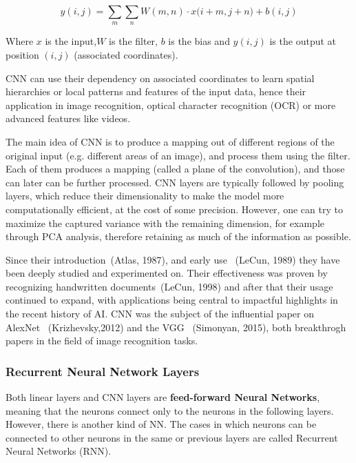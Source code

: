 \documentclass[a4paper, 11pt]{report}
\begin{document}
\begin{equation*}
    y(i,j) = \sum_m{\sum_n{W(m,n) \cdot x(i+m, j+n}) + b(i,j)}
\end{equation*}

 Where $x$ is the input,$W$ is the filter, $b$ is the bias and $y(i,j)$ is the output at position $(i,j)$ (associated coordinates).

 CNN can use their dependency on associated coordinates  to learn spatial hierarchies or local patterns and features of the input data, hence their application in image recognition, optical character recognition (OCR) or more advanced features like videos.

 The main idea of CNN is to produce a mapping out of different regions of the original input (e.g. different areas of an image), and process them using the filter. Each of them produces a mapping (called a plane of the convolution), and those can later can be further processed. CNN layers are typically followed by pooling layers, which reduce their dimensionality to make the model more computationally efficient, at the cost of some precision. However, one can try to maximize the captured variance with the remaining dimension, for example through PCA analysis, therefore retaining as much of the information as possible.

 Since their introduction~\cite{Atlas1987_Phoneme}(Atlas, 1987), and early use~\cite{LeCun1989_Handwritten_Zip} (LeCun, 1989) they have been deeply studied and experimented on. Their effectiveness was proven by recognizing handwritten documents~\cite{LeCun1998_Doc_Recognition}(LeCun, 1998) and after that their usage continued to expand, with applications being central to impactful highlights in the recent history of AI. CNN was the subject of the influential paper on AlexNet~\cite{Krizhevsky2012_AlexNet} (Krizhevsky,2012) and the VGG~\cite{Simonyan2015_Deep_Convolution} (Simonyan, 2015), both breakthrogh papers in the field of image recognition tasks.

\subsubsection{Recurrent Neural Network Layers}\label{Theory: RNN Layers}
 Both linear layers and CNN layers are \textbf{feed-forward Neural Networks}, meaning that the neurons connect only to the neurons in the following layers. However, there is another kind of NN. The cases in which neurons can be connected to other neurons in the same or previous layers are called Recurrent Neural Networks (RNN).
\end{document}
